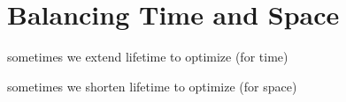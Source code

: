 \chapter{Balancing Time and Space}

sometimes we extend lifetime to optimize (for time)

sometimes we shorten lifetime to optimize (for space)